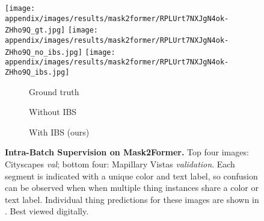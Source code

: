\documentclass[10pt,twocolumn,letterpaper]{article}
\begin{document}
\begin{figure*}[t]
\texttt{[image: appendix/images/results/mask2former/RPLUrt7NXJgN4ok-ZHho9Q\_gt.jpg]}
\texttt{[image: appendix/images/results/mask2former/RPLUrt7NXJgN4ok-ZHho9Q\_no\_ibs.jpg]}
\texttt{[image: appendix/images/results/mask2former/RPLUrt7NXJgN4ok-ZHho9Q\_ibs.jpg]}
\\


\begin{subfigure}[b]{0.28\textwidth}
 \centering
 \caption{Ground truth}
\end{subfigure}
\begin{subfigure}[b]{0.28\textwidth}
 \centering
 \caption{Without IBS}
\end{subfigure}
\begin{subfigure}[b]{0.28\textwidth}
 \centering
 \caption{With IBS (ours)}
\end{subfigure}

\vspace{-10pt}
\caption{\textbf{Intra-Batch Supervision on Mask2Former.} Top four images: Cityscapes \textit{val}; bottom four: Mapillary Vistas \textit{validation}. Each segment is indicated with a unique color and text label, so confusion can be observed when when multiple thing instances share a color or text label. Individual thing predictions for these images are shown in . Best viewed digitally.}  
\label{fig:results_m2f_overall}
\end{figure*} 
\end{document}
